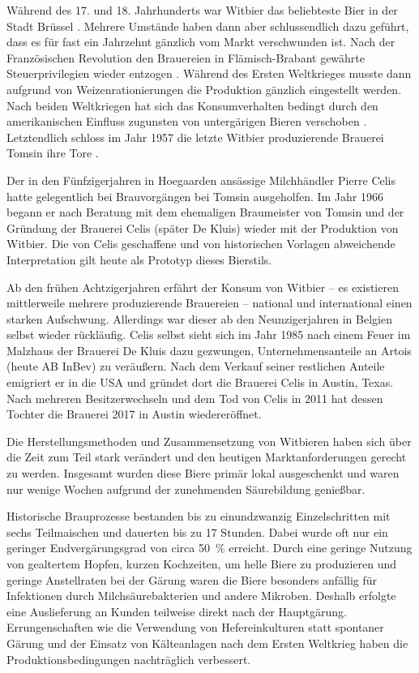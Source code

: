 \documentclass[a4paper,parskip=half]{scrartcl}
\begin{document}
Während des 17. und 18. Jahrhunderts war Witbier das beliebteste Bier
in der Stadt Brüssel \parencite{Zainasheff2007}.
Mehrere Umstände haben dann aber schlussendlich dazu geführt, dass
es für fast ein Jahrzehnt gänzlich vom Markt verschwunden ist.
Nach der Französischen Revolution den Brauereien in
Flämisch-Brabant gewährte Steuerprivilegien wieder entzogen
\parencite[44]{Roncoroni2018}. Während des Ersten Weltkrieges
musste dann aufgrund von Weizenrationierungen die Produktion gänzlich
eingestellt werden. Nach beiden Weltkriegen hat sich
das Konsumverhalten bedingt durch den amerikanischen
Einfluss zugunsten von untergärigen Bieren verschoben \parencite[4]{Strottner1999}. Letztendlich schloss im Jahr 1957 die letzte
Witbier produzierende Brauerei Tomsin ihre Tore \parencite[44]{Roncoroni2018}.

Der in den Fünfzigerjahren in Hoegaarden ansässige Milchhändler Pierre
Celis hatte gelegentlich bei Brauvorgängen bei Tomsin ausgeholfen. Im
Jahr 1966 begann er nach Beratung mit dem ehemaligen
Braumeister von Tomsin und der Gründung der Brauerei Celis
(später De Kluis) wieder mit der Produktion von Witbier. Die von
Celis geschaffene und von historischen Vorlagen abweichende Interpretation
gilt heute als Prototyp dieses Bierstils.
\parencite[37,49]{Hieronymus2010} 

Ab den frühen Achtzigerjahren erfährt der Konsum von Witbier – es
existieren mittlerweile mehrere produzierende Brauereien – national und
international einen starken Aufschwung. Allerdings war dieser
ab den Neunzigerjahren in Belgien selbst wieder rückläufig.
Celis selbst sieht sich im Jahr 1985 nach einem Feuer im Malzhaus der Brauerei
De Kluis dazu gezwungen, Unternehmensanteile an Artois (heute
AB InBev) zu veräußern. Nach dem Verkauf seiner restlichen Anteile
emigriert er in die USA und gründet dort die Brauerei Celis in Austin,
Texas. Nach mehreren Besitzerwechseln und dem Tod von Celis in 2011
hat dessen Tochter die Brauerei 2017 in Austin wiedereröffnet.
\parencites[1]{Strottner1999}[37,49]{Hieronymus2010}{Meewes2017}

Die Herstellungsmethoden und Zusammensetzung von Witbieren haben
sich über die Zeit zum Teil stark verändert und den heutigen
Marktanforderungen gerecht zu werden. Insgesamt wurden diese
Biere primär lokal ausgeschenkt und waren nur wenige
Wochen aufgrund der zunehmenden Säurebildung genießbar.
\parencite[118]{Strottner1999}

Historische Brauprozesse bestanden bis zu einundzwanzig
Einzelschritten mit sechs Teilmaischen und dauerten bis zu
17 Stunden. Dabei wurde oft nur ein geringer Endvergärungsgrad
von circa 50~\% erreicht. Durch eine geringe Nutzung von gealtertem
Hopfen, kurzen Kochzeiten, um helle Biere zu produzieren 
und geringe Anstellraten bei der Gärung waren die Biere besonders
anfällig für Infektionen durch Milchsäurebakterien und andere Mikroben.
Deshalb erfolgte eine Auslieferung an Kunden teilweise direkt nach
der Hauptgärung. Errungenschaften wie die Verwendung von
Hefereinkulturen statt spontaner Gärung und der Einsatz von
Kälteanlagen nach dem Ersten Weltkrieg haben die Produktionsbedingungen
nachträglich verbessert. \parencite[38–41]{Hieronymus2010}
\end{document}
